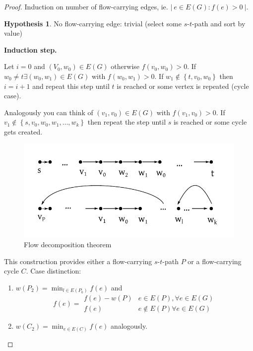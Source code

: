 \documentclass[a4paper]{article}
\theoremstyle{definition}
\newtheorem{hypothesis}[theorem]{Hypothesis}
\newcommand{\card}[1]{\left|\:\!#1\:\!\right|}
\newcommand{\set}[1]{\left\{#1\right\}}
\newcommand{\gath}[2]{$#1$-$#2$-path} %
\begin{document}
\begin{proof}
  Induction on number of flow-carrying edges, ie. $\card{ e \in E(G): f(e) > 0 }$. \\
  \begin{hypothesis}
    No flow-carrying edge: trivial (select some \gath st and sort by value)
  \end{hypothesis}
  \textbf{Induction step.}

  Let $i=0$ and $(V_0, w_0) \in E(G)$ otherwise $f(v_0, w_0) > 0$.
  If $w_0 \neq t \exists (w_0, w_1) \in E(G)$ with $f(w_0, w_1) > 0$.
  If $w_1 \notin \set{t, v_0, w_0}$ then $i = i + 1$ and repeat this step until $t$ is reached or some vertex is repeated (cycle case).

  Analogously you can think of $(v_1, v_0) \in E(G)$ with $f(v_1, v_0) > 0$. If $v_1 \notin \set{s, v_0, w_0, w_1, \ldots, w_k}$ then repeat the step until $s$ is reached or some cycle gets created.

  \begin{figure}[ht]
   \begin{center}
    \includegraphics{img/flow_decomposition_theorem.pdf}
    \caption{Flow decomposition theorem}
   \end{center}
  \end{figure}

  This construction provides either a flow-carrying \gath st $P$ or a flow-carrying cycle $C$. Case distinction:
  \begin{enumerate}
    \item $w(P_2) = \min_{l \in E(P_0)} f(e)$ and \[
          f(e) = \begin{array}{lc}
            f(e) - w(P)  & e \in E(P), \forall e \in E(G) \\
            f(e)         & e \notin E(P) \forall e \in E(G)
          \end{array}\]
    \item $w(C_2) = \min_{e \in E(C)} f(e)$ analogously.
  \end{enumerate}


\end{proof}
\end{document}
